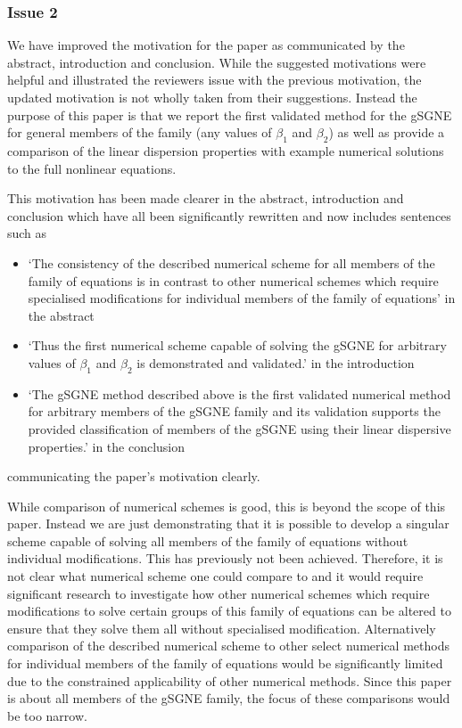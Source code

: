 \documentclass[10pt]{article}
\begin{document}
\subsubsection{Issue 2}
We have improved the motivation for the paper as communicated by the abstract, introduction and conclusion. While the suggested motivations were helpful and illustrated the reviewers issue with the previous motivation, the updated motivation is not wholly taken from their suggestions. Instead the purpose of this paper is that we report the first validated method for the gSGNE for general members of the family (any values of $\beta_1$ and $\beta_2$) as well as provide a comparison of the linear dispersion properties with example numerical solutions to the full nonlinear equations.

This motivation has been made clearer in the abstract, introduction and conclusion which have all been significantly rewritten and now includes sentences such as
\begin{itemize}
\item `The consistency of the described numerical scheme for all members of the family of equations is in contrast to other numerical schemes which require specialised modifications for individual members of the family of equations' in the abstract
	
\item`Thus the first numerical scheme capable of solving the gSGNE for arbitrary values of $\beta_1$ and $\beta_2$ is demonstrated and validated.' in the introduction
	
\item`The gSGNE method described above is the first validated numerical method for arbitrary members of the gSGNE family and its validation supports the provided classification of members of the gSGNE using their linear dispersive properties.' in the conclusion
\end{itemize}
communicating the paper's motivation clearly. 


While comparison of numerical schemes is good, this is beyond the scope of this paper.
Instead we are just demonstrating that it is possible to develop a singular scheme capable of solving all members of the family of equations without individual modifications. This has previously not been achieved. Therefore, it is not clear what numerical scheme one could compare to and it would require significant research to investigate how other
numerical schemes which require modifications to solve certain groups of this family of equations can be altered to ensure that they solve them all without specialised modification. Alternatively comparison of the described numerical scheme to other select numerical methods for individual members of the family of equations would be significantly limited due to the constrained applicability of other numerical methods. Since this paper is about all members of the gSGNE  family, the focus of these comparisons would be too narrow.
\end{document}
